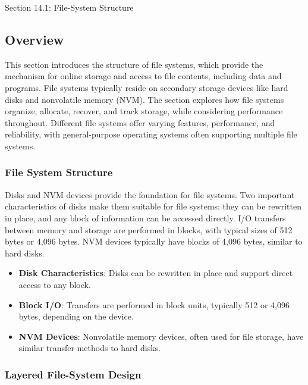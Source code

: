\begin{notes}{Section 14.1: File-System Structure}
    \subsection*{Overview}

    This section introduces the structure of file systems, which provide the mechanism for online storage and access to file contents, including data and programs. File systems typically reside on 
    secondary storage devices like hard disks and nonvolatile memory (NVM). The section explores how file systems organize, allocate, recover, and track storage, while considering performance throughout. 
    Different file systems offer varying features, performance, and reliability, with general-purpose operating systems often supporting multiple file systems.
    
    \subsubsection*{File System Structure}
    
    Disks and NVM devices provide the foundation for file systems. Two important characteristics of disks make them suitable for file systems: they can be rewritten in place, and any block of information 
    can be accessed directly. I/O transfers between memory and storage are performed in blocks, with typical sizes of 512 bytes or 4,096 bytes. NVM devices typically have blocks of 4,096 bytes, similar 
    to hard disks.
    
    \begin{highlight}
    
        \begin{itemize}
            \item \textbf{Disk Characteristics}: Disks can be rewritten in place and support direct access to any block.
            \item \textbf{Block I/O}: Transfers are performed in block units, typically 512 or 4,096 bytes, depending on the device.
            \item \textbf{NVM Devices}: Nonvolatile memory devices, often used for file storage, have similar transfer methods to hard disks.
        \end{itemize}
    
    \end{highlight}
    
    \subsubsection*{Layered File-System Design}
    

\end{notes}
